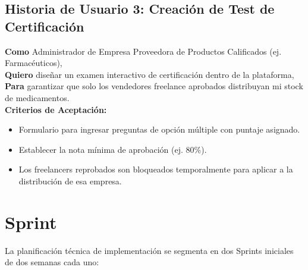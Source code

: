 \documentclass[12pt,spanish,a4paper]{report}
\begin{document}
\subsection*{Historia de Usuario 3: Creación de Test de Certificación}
\textbf{Como} Administrador de Empresa Proveedora de Productos Calificados (ej. Farmacéuticos),\\
\textbf{Quiero} diseñar un examen interactivo de certificación dentro de la plataforma,\\
\textbf{Para} garantizar que solo los vendedores freelance aprobados distribuyan mi stock de medicamentos.\\
\textbf{Criterios de Aceptación:}
\begin{itemize}
    \item Formulario para ingresar preguntas de opción múltiple con puntaje asignado.
    \item Establecer la nota mínima de aprobación (ej. 80\%).
    \item Los freelancers reprobados son bloqueados temporalmente para aplicar a la distribución de esa empresa.
\end{itemize}

\section{Sprint}
La planificación técnica de implementación se segmenta en dos Sprints iniciales de dos semanas cada uno:
\end{document}
